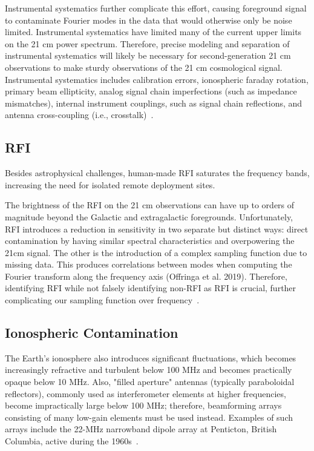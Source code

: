 	    Instrumental systematics further complicate this effort, causing foreground signal to contaminate Fourier modes in the data that would otherwise only be noise limited. Instrumental systematics have limited many of the current upper limits on the 21 cm power spectrum. Therefore, precise modeling and separation of instrumental systematics will likely be necessary for second-generation 21 cm observations to make sturdy observations of the 21 cm cosmological signal. Instrumental systematics includes calibration errors, ionospheric faraday rotation, primary beam ellipticity, analog signal chain imperfections (such as impedance mismatches), internal instrument couplings, such as signal chain reflections, and antenna cross-coupling (i.e., crosstalk)~\citep{2020ApJ...888...70K}.
	    
	    
	    
	    \subsection*{RFI}
	    
	    Besides astrophysical challenges, human-made RFI saturates the frequency bands, increasing the need for isolated remote deployment sites. 
	    
	    The brightness of the RFI on the 21 cm observations can have up to orders of magnitude beyond the Galactic and extragalactic foregrounds. Unfortunately, RFI introduces a reduction in sensitivity in two separate but distinct ways: direct contamination by having similar spectral characteristics and overpowering the 21cm signal. The other is the introduction of a complex sampling function due to missing data. This produces correlations between modes when computing the Fourier transform along the frequency axis (Offringa et al. 2019). Therefore,  identifying RFI while not falsely identifying non-RFI as RFI is crucial, further complicating our sampling function over frequency~\citep{2019MNRAS.488.2605K}.
	    
	    \subsection*{Ionospheric Contamination}
	    
	    The Earth's ionosphere also introduces significant fluctuations, which becomes increasingly refractive and turbulent below 100 MHz and becomes practically opaque below 10 MHz. Also, "filled aperture" antennas (typically paraboloidal reflectors), commonly used as interferometer elements at higher frequencies, become impractically large below 100 MHz; therefore, beamforming arrays consisting of many low-gain elements must be used instead. Examples of such arrays include the 22-MHz narrowband dipole array at Penticton, British Columbia, active during the 1960s~\citep{2005ITAP...53.2480E}.\\
	    
